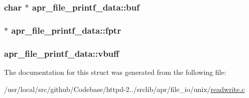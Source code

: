\subsubsection[{\texorpdfstring{buf}{buf}}]{\setlength{\rightskip}{0pt plus 5cm}char $\ast$ apr\+\_\+file\+\_\+printf\+\_\+data\+::buf}\hypertarget{structapr__file__printf__data_a6c9af2584611f87c25c0ed59dd6f53e0}{}\label{structapr__file__printf__data_a6c9af2584611f87c25c0ed59dd6f53e0}
\subsubsection[{\texorpdfstring{fptr}{fptr}}]{ $\ast$ apr\+\_\+file\+\_\+printf\+\_\+data\+::fptr}\hypertarget{structapr__file__printf__data_a6c7bcfc5ccbc0b9bf4c5890906b254f6}{}\label{structapr__file__printf__data_a6c7bcfc5ccbc0b9bf4c5890906b254f6}
\subsubsection[{\texorpdfstring{vbuff}{vbuff}}]{ apr\+\_\+file\+\_\+printf\+\_\+data\+::vbuff}\hypertarget{structapr__file__printf__data_a0e59269a08b5a60bb10bfd0c0dec0ffc}{}\label{structapr__file__printf__data_a0e59269a08b5a60bb10bfd0c0dec0ffc}


The documentation for this struct was generated from the following file\+:\begin{DoxyCompactItemize}
\item 
/usr/local/src/github/\+Codebase/httpd-\/2../srclib/apr/file\+\_\+io/unix/\hyperlink{unix_2readwrite_8c}{readwrite.\+c}\end{DoxyCompactItemize}
